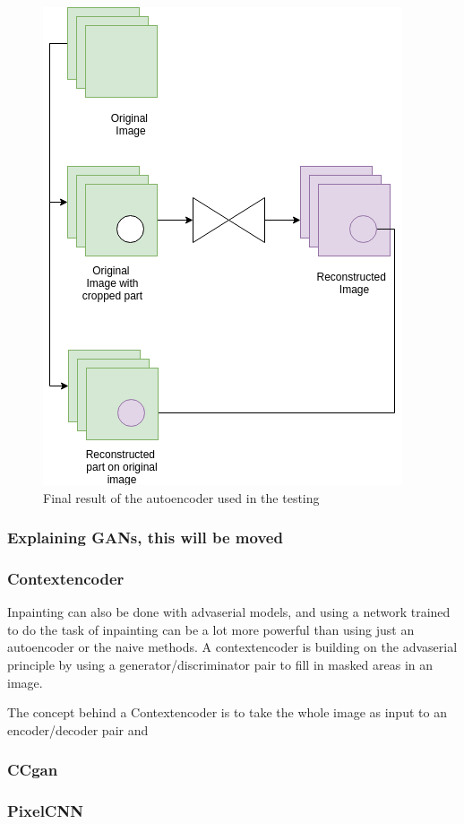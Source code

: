 	
	\begin{figure}[ht!]
	    \centering
	    \includegraphics[scale=0.5]{background/figures/AE_for_inpainting.png}
	    \caption{Final result of the autoencoder used in the testing}
	\end{figure}
	
	
	
	
	
      \subsubsection{Explaining GANs, this will be moved}
      
	
      \subsubsection{Contextencoder}
	Inpainting can also be done with advaserial models, and using a network trained to do the task of inpainting can be a lot more powerful than using just an autoencoder or the naive methods.
	A contextencoder is building on the advaserial principle by using a generator/discriminator pair to fill in masked areas in an image. 
	
	The concept behind a Contextencoder is to take the whole image as input to an encoder/decoder pair and 
	
	
	
      \subsubsection{CCgan}
      \subsubsection{PixelCNN}
      
\fi

  
 
